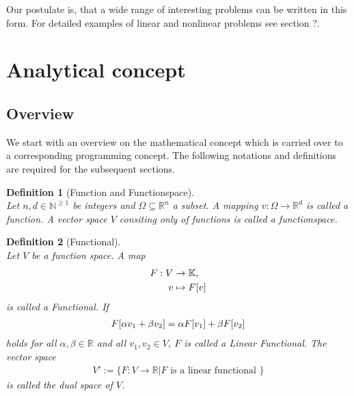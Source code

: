 \documentclass[a4paper,11pt]{article}
\numberwithin{equation}{section}
\newtheorem{definition}{Definition}[section]
\newcommand{\theoremNewline}{\hspace{1mm}\\}
\newcommand{\theoremEndLine}{\hspace{1mm}}
\newcommand{\komma}{\text{,}}
\newcommand{\K}{\mathbb{K}}
\newcommand{\N}{\mathbb{N}}
\newcommand{\R}{\mathbb{R}}
\begin{document}
    Our postulate is, that a wide range of interesting problems can be written in this form. For detailed examples of
    linear and nonlinear problems see section ?.

  \section{Analytical concept}

    \subsection{Overview}

      We start with an overview on the mathematical concept which is carried over to a corresponding programming
      concept. The following notations and definitions are required for the subsequent sections.

      \begin{definition}[Function and Functionspace]\theoremNewline
        Let ${n,d \in \N^{\geq 1}}$ be integers and ${\Omega \subseteq \mathbb{R}^n}$ a subset. A mapping
        ${v : \Omega \rightarrow \mathbb{R}^d}$ is called a \textnormal{function}. A vector space $V$ consiting only of
        functions is called a \textnormal{functionspace}.
      \end{definition}\theoremEndLine

    \begin{definition}[Functional]\theoremNewline
      Let $V$ be a function space. A map
      \begin{align}
        F: V &\rightarrow \K\komma
          \notag\\
        v &\mapsto F[v]
      \end{align}
      is called a \textnormal{Functional}. If
      \begin{align}
        F[\alpha v_1 + \beta v_2] = \alpha F[v_1] + \beta F[v_2]
          \notag
      \end{align}
      holds for all ${\alpha,\beta \in \R}$ and all ${v_1,v_2\in V}$, $F$ is called a \textnormal{Linear Functional}.
      The vector space
      \begin{align}
        V' := \big\{ F : V \rightarrow \R \big| F \text{ is a linear functional } \big\}
      \end{align}
      is called the dual space of $V$.
    \end{definition}\theoremEndLine
\end{document}
